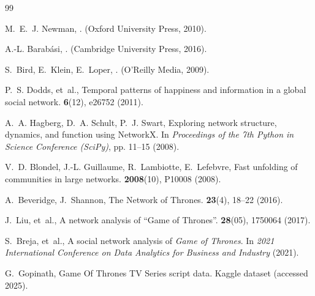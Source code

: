 \documentclass[9pt,twocolumn,twoside]{pnas-new}
\begin{document}

\showacknow{}


\begin{thebibliography}{99}

M.~E.~J. Newman,
.
\newblock (Oxford University Press, 2010).

A.-L. Barab{\'a}si,
.
\newblock (Cambridge University Press, 2016).

S.~Bird, E.~Klein, E.~Loper,
.
\newblock (O'Reilly Media, 2009).

P.~S. Dodds, et~al.,
\newblock Temporal patterns of happiness and information in a global social network.
 \textbf{6}(12), e26752 (2011).

A.~A. Hagberg, D.~A. Schult, P.~J. Swart,
\newblock Exploring network structure, dynamics, and function using NetworkX.
\newblock In {\em Proceedings of the 7th Python in Science Conference (SciPy)}, pp. 11--15 (2008).

V.~D. Blondel, J.-L. Guillaume, R.~Lambiotte, E.~Lefebvre,
\newblock Fast unfolding of communities in large networks.
 \textbf{2008}(10), P10008 (2008).

A.~Beveridge, J.~Shannon,
\newblock The Network of Thrones.
 \textbf{23}(4), 18--22 (2016).

J.~Liu, et~al.,
\newblock A network analysis of ``Game of Thrones''.
 \textbf{28}(05), 1750064 (2017).

S.~Breja, et~al.,
\newblock A social network analysis of \emph{Game of Thrones}.
\newblock In {\em 2021 International Conference on Data Analytics for Business and Industry} (2021).

G.~Gopinath,
\newblock Game Of Thrones TV Series script data.
\newblock Kaggle dataset (accessed 2025).

\end{thebibliography}
\end{document}
